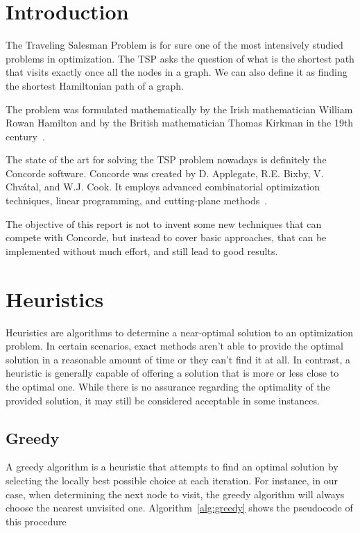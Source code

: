 \documentclass{article}
\begin{document}
\pagestyle{fancy}

\section{Introduction}
The Traveling Salesman Problem is for sure one of the most intensively studied problems in
optimization. The TSP asks the question of what is the shortest path that visits exactly
once all the nodes in a graph.
We can also define it as finding the shortest Hamiltonian path of a graph.

The problem was formulated mathematically by the Irish mathematician William Rowan
Hamilton and by the British mathematician Thomas Kirkman in the 19th century~\cite{biggs1986graph}.

The state of the art for solving the TSP problem nowadays is definitely the Concorde
software. Concorde was created by  D. Applegate, R.E. Bixby, V. Chvátal, and W.J. Cook.
It employs advanced combinatorial optimization techniques, linear programming, and cutting-plane methods~\cite{applegate1998solution}\cite{tuHu2022analyzing}.

The objective of this report is not to invent some new techniques that can compete with Concorde,
but instead to cover basic approaches, that can be implemented without much effort, and still lead
to good results.

\section{Heuristics}
Heuristics are algorithms to determine a near-optimal solution to an optimization problem. In certain scenarios,
exact methods aren't able to provide the optimal solution in a reasonable amount of time or they can't find it
at all. In contrast, a heuristic is generally capable of offering a solution that is more or less close to
the optimal one.
While there is no assurance regarding the optimality of the provided solution, it may still be considered
acceptable in some instances.

\subsection{Greedy}
A greedy algorithm is a heuristic that attempts to find an optimal solution by selecting the locally best possible choice at each iteration.
For instance, in our case, when determining the next node to visit, the greedy algorithm will always choose
the nearest unvisited one. Algorithm~\ref{alg:greedy} shows the pseudocode of this procedure
\end{document}

